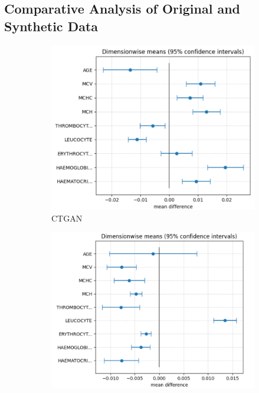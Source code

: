 \subsection{Comparative Analysis of Original and Synthetic Data}

\begin{figure}[H]
    \centering
    \begin{subfigure}[b]{0.47\textwidth}
        \centering
        \includegraphics[width=\textwidth]{images/avg_dim_2_ctgan.png}
        \caption{CTGAN}
        \label{fig:avg_dim_2_ctgan}
    \end{subfigure}
    \hfill
    \begin{subfigure}[b]{0.47\textwidth}
        \centering
        \includegraphics[width=\textwidth]{images/avg_dim_2_begreat.png}

\end{subfigure}
\end{figure}
